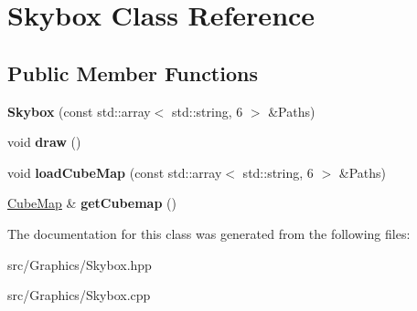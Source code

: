 \hypertarget{class_skybox}{\section{Skybox Class Reference}
\label{class_skybox}
}
\subsection*{Public Member Functions}
\begin{DoxyCompactItemize}
\item 
\hypertarget{class_skybox_a8ea7652a84027f1295552ad385da25ab}{{\bfseries Skybox} (const std\+::array$<$ std\+::string, 6 $>$ \&Paths)}\label{class_skybox_a8ea7652a84027f1295552ad385da25ab}

\item 
\hypertarget{class_skybox_ae1df0e8250a0cef935e1edb108329bf7}{void {\bfseries draw} ()}\label{class_skybox_ae1df0e8250a0cef935e1edb108329bf7}

\item 
\hypertarget{class_skybox_a192779bc571cd5079850d7fcd36cbad1}{void {\bfseries load\+Cube\+Map} (const std\+::array$<$ std\+::string, 6 $>$ \&Paths)}\label{class_skybox_a192779bc571cd5079850d7fcd36cbad1}

\item 
\hypertarget{class_skybox_a589d97b0c8fb184b58277b1abcb29c71}{\hyperlink{class_cube_map}{Cube\+Map} \& {\bfseries get\+Cubemap} ()}\label{class_skybox_a589d97b0c8fb184b58277b1abcb29c71}

\end{DoxyCompactItemize}


The documentation for this class was generated from the following files\+:\begin{DoxyCompactItemize}
\item 
src/\+Graphics/Skybox.\+hpp\item 
src/\+Graphics/Skybox.\+cpp\end{DoxyCompactItemize}
